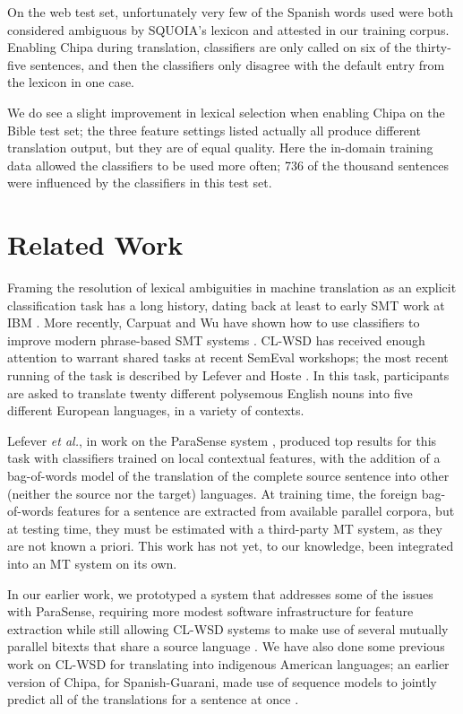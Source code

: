 On the web test set, unfortunately very few of the Spanish words used were both
considered ambiguous by SQUOIA's lexicon and attested in our training corpus.
Enabling Chipa during translation, classifiers are only called on six of the
thirty-five sentences, and then the classifiers only disagree with the default
entry from the lexicon in one case.

We do see a slight improvement in lexical selection when enabling Chipa on the
Bible test set; the three feature settings listed actually all produce
different translation output, but they are of equal quality. Here the in-domain
training data allowed the classifiers to be used more often; 736 of the
thousand sentences were influenced by the classifiers in this test set.

\section{Related Work}
Framing the resolution of lexical ambiguities in machine translation
as an explicit classification
task has a long history, dating back at least to early SMT work at IBM
\cite{Brown91word-sensedisambiguation}.  More recently, Carpuat and Wu have
shown how to use classifiers to improve modern phrase-based SMT systems
\cite{carpuatpsd}.
CL-WSD has received enough attention to warrant shared tasks at recent SemEval
workshops; the most recent running of the task is described by Lefever and
Hoste \cite{task10}.
In this task, participants are asked to translate twenty different polysemous
English nouns into five different European languages, in a variety of contexts.

Lefever \emph{et al.}, in work on the ParaSense system
\cite{lefever-hoste-decock:2011:ACL-HLT2011}, produced top results for
this task with classifiers trained on local contextual features, with the 
addition of a bag-of-words model of the translation of the complete source
sentence into other (neither the source nor the target) languages. At training
time, the foreign bag-of-words features for a sentence are extracted from
available parallel corpora, but at testing time, they must be
estimated with a third-party MT system, as they are not known a priori.
This work has not yet, to our knowledge, been integrated into an MT system
on its own.

In our earlier work, we prototyped a system that addresses some of the issues
with ParaSense, requiring more modest software infrastructure for feature
extraction while still allowing CL-WSD systems to make use of several mutually
parallel bitexts that share a source language
\cite{rudnick-liu-gasser:2013:SemEval-2013}.
We have also done some previous work on CL-WSD for translating into indigenous
American languages; an earlier version of Chipa, for Spanish-Guarani, made use
of sequence models to jointly predict all of the translations for a sentence at
once \cite{rudnick-gasser:2013:HyTra}.

